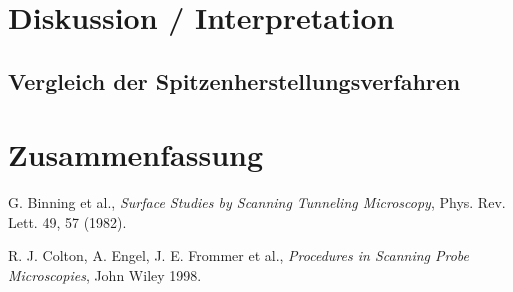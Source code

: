 \documentclass[10pt, a4paper]{article}
\begin{document}
\section{Diskussion / Interpretation}

\subsection{Vergleich der Spitzenherstellungsverfahren}

\section{Zusammenfassung}


\begin{thebibliography}{9}

  G. Binning et al.,
  \emph{Surface Studies by Scanning Tunneling Microscopy},
  Phys. Rev. Lett. 49, 57 (1982).

  R. J. Colton, A. Engel, J. E. Frommer et al.,
  \emph{Procedures in Scanning Probe Microscopies},
  John Wiley 1998.
  
\end{thebibliography}
\end{document}
